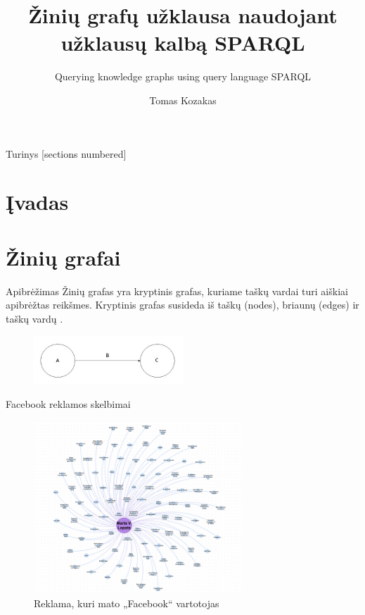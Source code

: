 \documentclass[10pt]{beamer}
\title{Žinių grafų užklausa naudojant užklausų kalbą SPARQL}
\subtitle{Querying knowledge graphs using query language SPARQL}
\date{}
\author{Tomas Kozakas}
\institute{Matematikos ir informatikos fakultetas}
\begin{document}
\pagecolor{white}
\maketitle

\begin{frame}{Turinys}
  [sections numbered]
  \tableofcontents
\end{frame}

\section{Įvadas}

\section{Žinių grafai}

\begin{frame}[fragile]{Apibrėžimas}
    Žinių grafas yra kryptinis grafas, kuriame taškų vardai turi aiškiai apibrėžtas reikšmes. Kryptinis grafas susideda iš taškų (nodes), briaunų (edges) ir taškų vardų \cite{stanford_what_2021}.
    \begin{figure}[htbp]
        \centering
        \includegraphics[width=0.5\textwidth]{img/triple.jpg}
        \label{fig:triple}
    \end{figure}
\end{frame}

\begin{frame}[fragile]{Facebook reklamos skelbimai}
    \begin{figure}[htbp]
          \centering
          \includegraphics[width=0.7\textwidth]{img/facebook_graph.png}
          \caption{Reklama, kuri mato „Facebook“ vartotojas \cite{medium_article}}
          \label{fig:nodes}
    \end{figure}
\end{frame}
\end{document}
